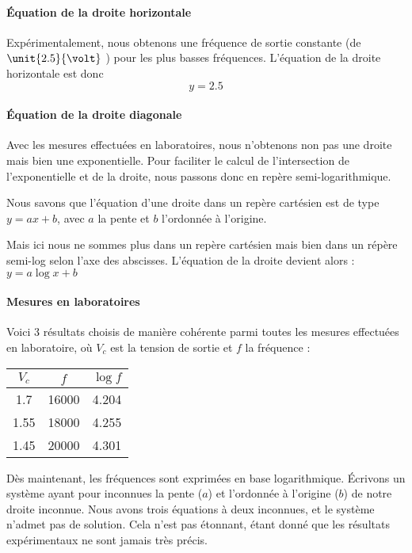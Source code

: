 \paragraph{Équation de la droite horizontale}
Expérimentalement, nous obtenons une fréquence de sortie constante (de $\unit{2.5}{\volt}$ )
pour les plus basses fréquences. L'équation de la droite horizontale est donc \[y=2.5\]

\paragraph{Équation de la droite diagonale}

Avec les mesures effectuées en laboratoires, nous n'obtenons non pas une droite mais bien une exponentielle.
Pour faciliter le calcul de l'intersection de l'exponentielle et de la droite, nous passons donc en repère
semi-logarithmique.

Nous savons que l'équation d'une droite dans un repère cartésien est de type $y=ax+b$, avec $a$ la pente
et $b$ l'ordonnée à l'origine.

Mais ici nous ne sommes plus dans un repère cartésien mais bien dans un répère semi-log selon l'axe des
abscisses. L'équation de la droite devient alors : $y=a\log{x}+b$

\paragraph{Mesures en laboratoires}

Voici 3 résultats choisis de manière cohérente parmi toutes les mesures effectuées en laboratoire, où
$V_c$ est la tension de sortie et $f$ la fréquence :

\begin{center}
\begin{tabular}{|c|c|c|}
\hline
$V_c$ & $f$ & $\log{f}$ \\
\hline
1.7 & 16000 & 4.204 \\
\hline
1.55 & 18000 & 4.255 \\
\hline
1.45 & 20000 & 4.301 \\
\hline
\end{tabular}
\end{center}

Dès maintenant, les fréquences sont exprimées en base logarithmique.
Écrivons un système ayant pour inconnues la pente ($a$) et l'ordonnée à l'origine ($b$) de notre droite
inconnue.
Nous avons trois équations à deux inconnues, et le système n'admet pas de solution.
Cela n'est pas étonnant, étant donné que les résultats expérimentaux ne sont jamais très précis.

